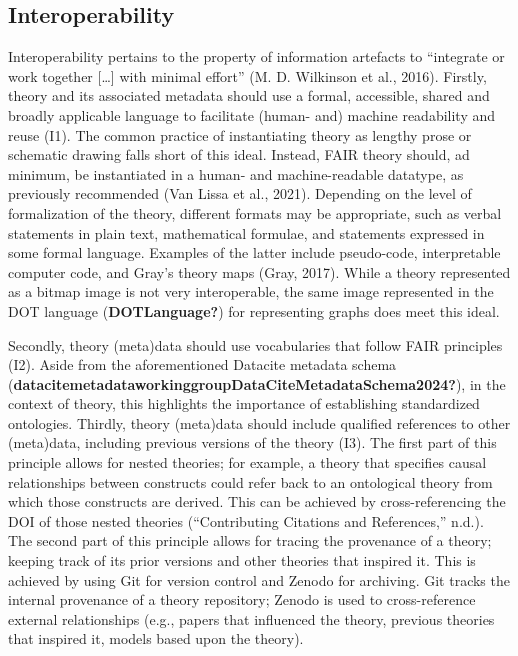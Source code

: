 \documentclass[
  man,floatsintext]{apa6}
\begin{document}
\subsection{Interoperability}\label{interoperability}

Interoperability pertains to the property of information artefacts to ``integrate or work together {[}\ldots{]} with minimal effort'' (M. D. Wilkinson et al., 2016).
Firstly, theory and its associated metadata should use a formal, accessible, shared and broadly applicable language to facilitate (human- and) machine readability and reuse (I1).
The common practice of instantiating theory as lengthy prose or schematic drawing falls short of this ideal.
Instead, FAIR theory should, ad minimum,
be instantiated in a human- and machine-readable datatype,
as previously recommended (Van Lissa et al., 2021).
Depending on the level of formalization of the theory,
different formats may be appropriate,
such as verbal statements in plain text,
mathematical formulae,
and statements expressed in some formal language.
Examples of the latter include pseudo-code,
interpretable computer code,
and Gray's theory maps (Gray, 2017).
While a theory represented as a bitmap image is not very interoperable,
the same image represented in the DOT language (\textbf{DOTLanguage?}) for representing graphs does meet this ideal.

Secondly, theory (meta)data should use vocabularies that follow FAIR principles (I2).
Aside from the aforementioned Datacite metadata schema (\textbf{datacitemetadataworkinggroupDataCiteMetadataSchema2024?}),
in the context of theory, this highlights the importance of establishing standardized ontologies.
Thirdly, theory (meta)data should include qualified references to other (meta)data, including previous versions of the theory (I3).
The first part of this principle allows for nested theories;
for example, a theory that specifies causal relationships between constructs could refer back to an ontological theory from which those constructs are derived.
This can be achieved by cross-referencing the DOI of those nested theories ({``Contributing {Citations} and {References},''} n.d.).
The second part of this principle allows for tracing the provenance of a theory; keeping track of its prior versions and other theories that inspired it.
This is achieved by using Git for version control and Zenodo for archiving.
Git tracks the internal provenance of a theory repository; Zenodo is used to cross-reference external relationships (e.g., papers that influenced the theory, previous theories that inspired it, models based upon the theory).
\end{document}

